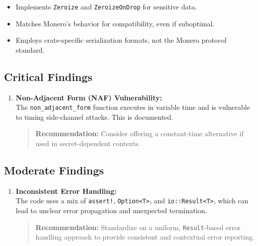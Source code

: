 \documentclass[12pt,a4paper]{article}
\begin{document}
\begin{itemize}
  \item Implements \texttt{Zeroize} and \texttt{ZeroizeOnDrop} for sensitive data.
  \item Matches Monero's behavior for compatibility, even if suboptimal.
  \item Employs crate-specific serialization formats, not the Monero protocol standard.
\end{itemize}

\subsection{Critical Findings}
\begin{enumerate}
    \item \textbf{Non-Adjacent Form (NAF) Vulnerability:} \\
    The \texttt{non\_adjacent\_form} function executes in variable time and is vulnerable to timing side-channel attacks.  This is documented.
    \begin{quote}
     \textbf{Recommendation:} Consider offering a constant-time alternative if used in secret-dependent contexts.
    \end{quote}

\end{enumerate}

\subsection{Moderate Findings}
\begin{enumerate}
    \item \textbf{Inconsistent Error Handling:} \\
    The code uses a mix of \texttt{assert!}, \texttt{Option<T>}, and \texttt{io::Result<T>}, which can lead to unclear error propagation and unexpected termination.
    \begin{quote}
     \textbf{Recommendation:} Standardize on a uniform, \texttt{Result}-based error handling approach to provide consistent and contextual error reporting.
    \end{quote}
\end{enumerate}
\end{document}
